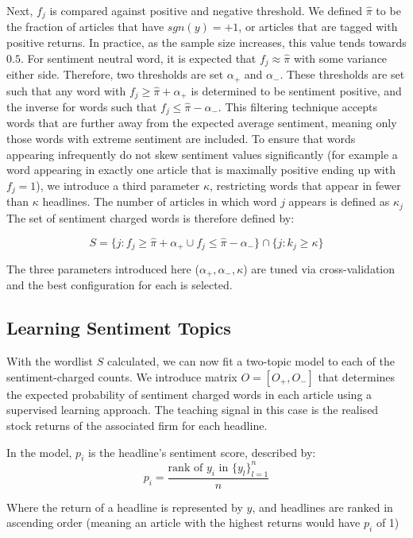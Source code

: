 \documentclass[ oneside,%
                    author={Joshua Felmeden},
                    degree={MEng},
                     title={Semantic Analysis of Financial Headlines Based on Realised Stock Returns},
                  subtitle={}]{dissertation}
\begin{document}
Next, $f_j$ is compared against positive and negative threshold. We defined $\hat \pi$ to be the fraction of articles that have $sgn(y) = +1$, or articles that are tagged with positive returns. In practice, as the sample size increases, this value tends towards $0.5$. For sentiment neutral word, it is expected that $f_j \approx \hat \pi$ with some variance either side. Therefore, two thresholds are set $\alpha_+$ and $\alpha_-$. These thresholds are set such that any word with $f_j \ge \hat \pi + \alpha_+$ is determined to be sentiment positive, and the inverse for words such that $f_j \le \hat \pi - \alpha_-$. This filtering technique accepts words that are further away from the expected average sentiment, meaning only those words with extreme sentiment are included. To ensure that words appearing infrequently do not skew sentiment values significantly (for example a word appearing in exactly one article that is maximally positive ending up with $f_j = 1$), we introduce a third parameter $\kappa$, restricting words that appear in fewer than $\kappa$ headlines. The number of articles in which word $j$ appears is defined as $\kappa_j$ The set of sentiment charged words is therefore defined by:

\begin{equation}
S = \{j : f_j \ge \hat \pi + \alpha_+ \cup f_j \le \hat \pi - \alpha_- \} \cap  \{ j : k_j \ge \kappa \}
\end{equation}

The three parameters introduced here ($\alpha_+, \alpha_-, \kappa$) are tuned via cross-validation and the best configuration for each is selected.

\subsection{Learning Sentiment Topics}
With the wordlist $S$ calculated, we can now fit a two-topic model to each of the sentiment-charged counts. We introduce matrix $O = [O_+,O_-]$ that determines the expected probability of sentiment charged words in each article using a supervised learning approach. The teaching signal in this case is the realised stock returns of the associated firm for each headline.

In the model, $p_i$ is the headline's sentiment score, described by:
\begin{equation}
p_i = \frac{\text{rank of } y_i \text{ in } \{y_l\}_{l=1}^n}{n}
\end{equation}

Where the return of a headline is represented by $y$, and headlines are ranked in ascending order (meaning an article with the highest returns would have $p_i$ of 1)
\end{document}
